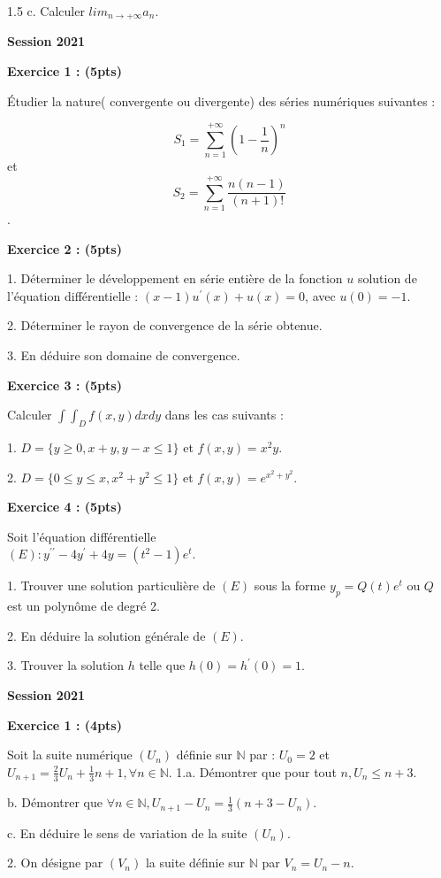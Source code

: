 \documentclass[12pt]{article}
\begin{document}
\begin{spacing}{1.5}
c. Calculer $lim_{n\to +\infty}a_n$.

\textbf{Session 2021}

\textbf{Exercice 1 : (5pts)}

Étudier la nature( convergente ou divergente) des séries numériques suivantes : 

\[S_1=\sum^{+\infty}_{n=1}(1-\frac{1}{n})^n\] et \[S_2=\sum^{+\infty}_{n=1}\frac{n(n-1)}{(n+1)!}\].

\textbf{Exercice 2 : (5pts)}

1. Déterminer le développement en série entière de la fonction $u$ solution de l'équation différentielle : $(x-1)u^{\prime}(x) + u(x)=0$, avec $u(0)=-1$.

2. Déterminer le rayon de convergence de la série obtenue.

3. En déduire son domaine de convergence.

\textbf{Exercice 3 : (5pts)}

Calculer $\int\int_{D}f(x,y)dxdy$ dans les cas suivants :

1. $D= \lbrace y\geq 0, x+y, y-x\leq 1\rbrace$ et $f(x,y)=x^{2}y$.

2. $D= \lbrace {0\leq y\leq x, x^2+y^2 \leq 1\rbrace}$ et $f(x,y)=e^{x^2+y^2}$.

\textbf{Exercice 4 : (5pts)}

Soit l'équation différentielle \\
$(E) : y^{\prime\prime}-4y^{\prime} + 4y = (t^2 - 1)e^t$.

1. Trouver une solution particulière de $(E)$ sous la forme $y_p= Q(t)e^t$ ou $Q$ est un polynôme de degré 2.

2. En déduire la solution générale de $(E)$.

3. Trouver la solution $h$ telle que $h(0)=h^{\prime}(0)=1$.

\textbf{Session 2021}

\textbf{Exercice 1 : (4pts)}

Soit la suite numérique $(U_n)$ définie sur $\mathbb{N}$ par : $U_0 = 2$ et $U_{n+1} = \frac{2}{3}U_n + \frac{1}{3}n + 1, \forall {n\in \mathbb{N}}$.
1.a. Démontrer que pour tout $n, U_n\leq n+3$.

b. Démontrer que $\forall {n\in \mathbb{N}}, U_{n+1} - U_n = \frac{1}{3}(n+3-U_n)$.

c. En déduire le sens de variation de la suite $(U_n)$.

2. On désigne par $(V_n)$ la suite définie sur $\mathbb{N}$ par $V_n =U_n-n$.


\end{spacing}
\end{document}
